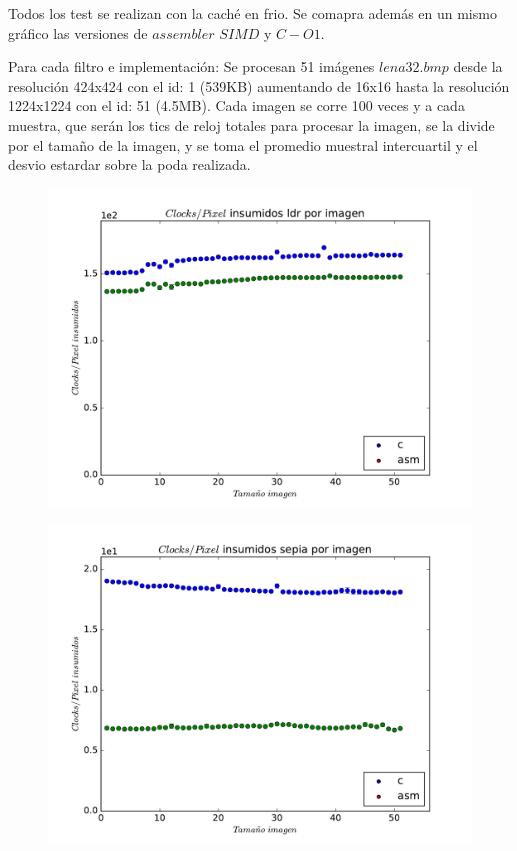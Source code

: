 Todos los test se realizan con la caché en frio. Se comapra además en un mismo gráfico las versiones de $assembler$ $SIMD$ y $C-O1$.

Para cada filtro e implementación: Se procesan 51 imágenes $lena32.bmp$ desde la resolución 424x424 con el id: 1 (539KB) aumentando de 16x16 hasta la resolución 1224x1224 con el id: 51 (4.5MB). Cada imagen se corre 100 veces y a cada muestra, que serán los tics de reloj totales para procesar la imagen, se la divide por el tamaño de la imagen, y se toma el promedio muestral intercuartil y el desvio estardar sobre la poda realizada.
 
\begin{figure}
  \begin{center}
	\includegraphics[scale=0.5]{ldrall.pdf}
  \end{center}
\end{figure}

\begin{figure}
  \begin{center}
	\includegraphics[scale=0.5]{sepiaall.pdf}
  \end{center}
\end{figure}

